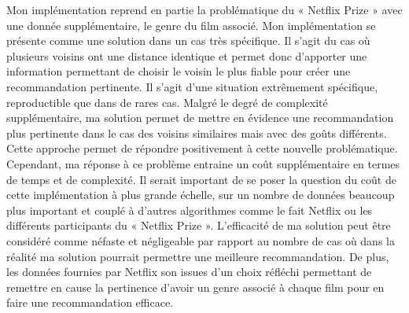 Mon implémentation reprend en partie la problématique du  « Netflix Prize » avec une donnée supplémentaire, le genre du film associé. Mon implémentation se présente comme une solution dans un cas très spécifique. Il s’agit du cas où plusieurs voisins ont une distance identique et permet donc d’apporter une information permettant de choisir le voisin le plus fiable pour créer une recommandation pertinente. Il s’agit d’une situation extrêmement spécifique, reproductible que dans de rares cas. Malgré le degré de complexité supplémentaire, ma solution permet de mettre en évidence une recommandation plus pertinente dans le cas des voisins similaires mais avec des goûts différents. Cette approche permet de répondre positivement à cette nouvelle problématique. Cependant, ma réponse à ce problème entraine un coût supplémentaire en termes de temps et de complexité. Il serait important de se poser la question du coût de cette implémentation à plus grande échelle, sur un nombre de données beaucoup plus important et couplé à d’autres algorithmes comme le fait Netflix ou les différents participants du « Netflix Prize ». L’efficacité de ma solution peut être considéré comme néfaste et négligeable par rapport au nombre de cas où dans la réalité ma solution pourrait permettre une meilleure recommandation. De plus, les données fournies par Netflix son issues d’un choix réfléchi permettant de remettre en cause la pertinence d’avoir un genre associé à chaque film pour en faire une recommandation efficace. 


